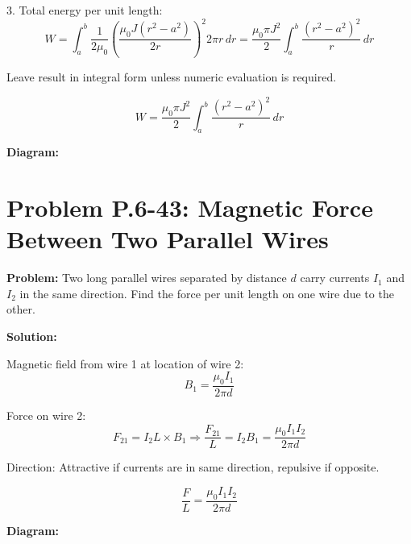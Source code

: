 \documentclass[12pt]{article}
\begin{document}
3. Total energy per unit length:
\[
W = \int_a^b \frac{1}{2\mu_0} \left( \frac{\mu_0 J (r^2 - a^2)}{2r} \right)^2 2\pi r \, dr
= \frac{\mu_0 \pi J^2}{2} \int_a^b \frac{(r^2 - a^2)^2}{r} \, dr
\]

Leave result in integral form unless numeric evaluation is required.

\begin{tcolorbox}
\[
\boxed{W = \frac{\mu_0 \pi J^2}{2} \int_a^b \frac{(r^2 - a^2)^2}{r} \, dr}
\]
\end{tcolorbox}

\textbf{Diagram:}
\begin{center}
\end{center}



\section*{Problem P.6-43: Magnetic Force Between Two Parallel Wires}

\textbf{Problem:}  
Two long parallel wires separated by distance \( d \) carry currents \( I_1 \) and \( I_2 \) in the same direction. Find the force per unit length on one wire due to the other.

\textbf{Solution:}

Magnetic field from wire 1 at location of wire 2:
\[
B_1 = \frac{\mu_0 I_1}{2\pi d}
\]

Force on wire 2:
\[
F_{21} = I_2 L \times B_1 \Rightarrow \frac{F_{21}}{L} = I_2 B_1 = \frac{\mu_0 I_1 I_2}{2\pi d}
\]

Direction: Attractive if currents are in same direction, repulsive if opposite.

\begin{tcolorbox}
\[
\boxed{\frac{F}{L} = \frac{\mu_0 I_1 I_2}{2\pi d}}
\]
\end{tcolorbox}

\textbf{Diagram:}
\begin{center}
\end{center}
\end{document}
